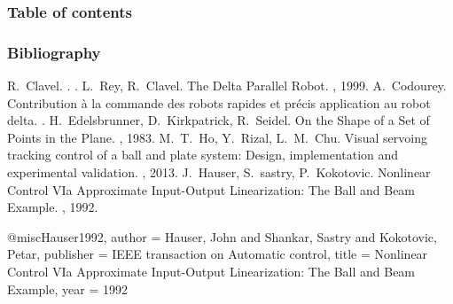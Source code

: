 




%
\frame{\titlepage}
%
\begin{frame}
\frametitle{Table of contents}
\begin{multicols}{2}
\tableofcontents
\end{multicols}
\end{frame}


%

%

%
\begin{frame}[allowframebreaks]
  \frametitle<presentation>{Bibliography}
  \begin{thebibliography}{10}
  \beamertemplatearticlebibitems
    R.~Clavel.
    .
    .
  \beamertemplatearticlebibitems
    L.~Rey, R.~Clavel.
    \newblock The Delta Parallel Robot.
    , 1999.
  \beamertemplatearticlebibitems
    A.~Codourey.
    \newblock Contribution {\`{a}} la commande des robots rapides et pr{\'{e}}cis application au robot delta.
    .
  \beamertemplatearticlebibitems
    H.~Edelsbrunner, D.~Kirkpatrick, R.~Seidel.
    \newblock On the Shape of a Set of Points in the Plane.
    , 1983.
  \beamertemplatearticlebibitems
    M.~T.~Ho, Y.~Rizal, L.~M.~Chu.
    \newblock Visual servoing tracking control of a ball and plate system: Design, implementation and experimental validation.
    , 2013.
  \beamertemplatearticlebibitems
    J.~Hauser, S.~sastry, P.~Kokotovic.
    \newblock Nonlinear Control VIa Approximate Input-Output Linearization: The Ball and Beam Example.
    , 1992.
  \end{thebibliography}
\end{frame}




@misc{Hauser1992,
author = {Hauser, John and Shankar, Sastry and Kokotovic, Petar},
publisher = {IEEE transaction on Automatic control},
title = {{Nonlinear Control VIa Approximate Input-Output Linearization: The Ball and Beam Example}},
year = {1992}
}